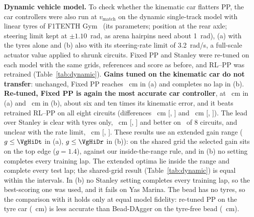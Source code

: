 \documentclass{IJCAS}
\begin{document}
\textbf{Dynamic vehicle model.} To check whether the kinematic car flatters PP, the car controllers were also run at $v_{\mathrm{match}}$ on the dynamic single-track model with linear tyres of F1TENTH Gym~\cite{okelly2020} (its parameters; position at the rear axle; steering limit kept at $\pm1.10$~rad, as arena hairpins need about 1~rad), (a) with the tyres alone and (b) also with its steering-rate limit of 3.2~rad/s, a full-scale actuator value applied to shrunk circuits. Fixed PP and Stanley were re-tuned on each model with the same grids, references and score as before, and RL--PP was retrained (Table~\ref{tab:dynamic}). \textbf{Gains tuned on the kinematic car do not transfer}: unchanged, Fixed PP reaches \VrmseDtFix~cm in (a) and completes no lap in (b). \textbf{Re-tuned, Fixed PP is again the most accurate car controller}, at \VrmseDtFixH~cm in (a) and \VrmseDrFixH~cm in (b), about six and ten times its kinematic error, and it beats retrained RL--PP on all eight circuits (differences \VdynDtFixRLDiff~cm [\VdynDtFixRLLo, \VdynDtFixRLHi] and \VdynDrFixRLDiff~cm [\VdynDrFixRLLo, \VdynDrFixRLHi]). The lead over Stanley is clear with tyres only, \VdynDtFixStDiff~cm [\VdynDtFixStLo, \VdynDtFixStHi] and better on \VdynDtFixStBetter\ of 8 circuits, and unclear with the rate limit, \VdynDrFixStDiff~cm [\VdynDrFixStLo, \VdynDrFixStHi]. These results use an extended gain range ($g\le\VgHiDt$ in (a), $g\le\VgHiDr$ in (b)): on the shared grid the selected gain sits on the top edge ($g=1.4$), against our inside-the-range rule, and in (b) no setting completes every training lap. The extended optima lie inside the range and complete every test lap; the shared-grid result (Table~\ref{tab:dynamic}) is equal within the intervals. In (b) no Stanley setting completes every training lap, so the best-scoring one was used, and it fails on Yas Marina. The bead has no tyres, so the comparison with it holds only at equal model fidelity: re-tuned PP on the tyre car (\VrmseDtFixH~cm) is less accurate than Bead-DAgger on the tyre-free bead (\VrmseDagger~cm).

\begin{table}[t]
\caption{Eight test circuits at $v_{\mathrm{match}}$ on the dynamic single-track car: (a) tyres only, (b) tyres and steering-rate limit. Settings: $(L_d,g)$ or $(k,k_s)$. RMSE in cm against the extracted reference (Extr.) and the true centerline (True); Laps: \% completed.}\label{tab:dynamic}
\centering
{}
\end{table}
\end{document}
